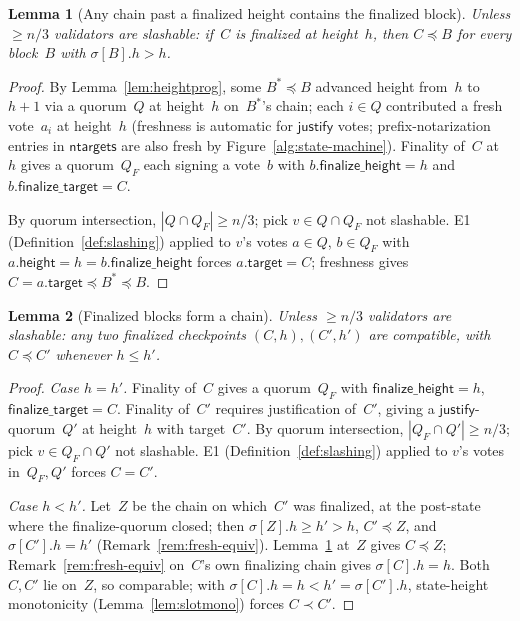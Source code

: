 \ifx\litemode\undefined\documentclass{article}\fi
\newcommand{\target}{\mathsf{target}}
\newcommand{\height}{\mathsf{height}}
\newcommand{\just}{\ensuremath{\mathsf{justify}}\xspace}
\newcommand{\finalizeHeight}{\mathsf{finalize\_height}}
\newcommand{\finalizeTarget}{\mathsf{finalize\_target}}
\newcommand{\ntargets}{\mathsf{ntargets}}
\theoremstyle{plain}
\newtheorem{lemma}{Lemma}
\theoremstyle{definition}
\theoremstyle{remark}
\begin{document}
\begin{lemma}[Any chain past a finalized height contains the finalized block]\label{lem:mainsafety}
Unless $\geq n/3$ validators are slashable: if~$C$ is finalized at height~$h$, then $C \preceq B$ for every block~$B$ with $\sigma[B].h > h$.
\end{lemma}

\begin{proof}
By Lemma~\ref{lem:heightprog}, some $B^* \preceq B$ advanced height from~$h$ to~$h+1$ via a quorum~$Q$ at height~$h$ on~$B^*$'s chain; each $i \in Q$ contributed a fresh vote~$a_i$ at height~$h$ (freshness is automatic for \just votes; prefix-notarization entries in $\ntargets$ are also fresh by Figure~\ref{alg:state-machine}).
Finality of~$C$ at~$h$ gives a quorum~$Q_F$ each signing a vote~$b$ with $b.\finalizeHeight = h$ and $b.\finalizeTarget = C$.

By quorum intersection, $|Q \cap Q_F| \geq n/3$; pick $v \in Q \cap Q_F$ not slashable.
E1 (Definition~\ref{def:slashing}) applied to $v$'s votes $a \in Q$, $b \in Q_F$ with $a.\height = h = b.\finalizeHeight$ forces $a.\target = C$; freshness gives $C = a.\target \preceq B^* \preceq B$.
\end{proof}

\begin{lemma}[Finalized blocks form a chain]\label{lem:finchain}
Unless $\geq n/3$ validators are slashable: any two finalized checkpoints $(C, h), (C', h')$ are compatible, with $C \preceq C'$ whenever $h \leq h'$.
\end{lemma}

\begin{proof}
\emph{Case $h = h'$.}
Finality of~$C$ gives a quorum~$Q_F$ with $\finalizeHeight = h$, $\finalizeTarget = C$.
Finality of~$C'$ requires justification of~$C'$, giving a \just-quorum~$Q'$ at height~$h$ with target~$C'$.
By quorum intersection, $|Q_F \cap Q'| \geq n/3$; pick $v \in Q_F \cap Q'$ not slashable.
E1 (Definition~\ref{def:slashing}) applied to $v$'s votes in~$Q_F, Q'$ forces $C = C'$.

\emph{Case $h < h'$.}
Let~$Z$ be the chain on which~$C'$ was finalized, at the post-state where the finalize-quorum closed; then $\sigma[Z].h \geq h' > h$, $C' \preceq Z$, and $\sigma[C'].h = h'$ (Remark~\ref{rem:fresh-equiv}).
Lemma~\ref{lem:mainsafety} at~$Z$ gives $C \preceq Z$; Remark~\ref{rem:fresh-equiv} on~$C$'s own finalizing chain gives $\sigma[C].h = h$.
Both~$C, C'$ lie on~$Z$, so comparable; with $\sigma[C].h = h < h' = \sigma[C'].h$, state-height monotonicity (Lemma~\ref{lem:slotmono}) forces $C \prec C'$.
\end{proof}
\end{document}
